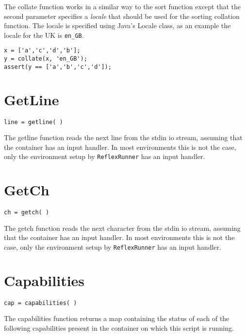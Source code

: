 The collate function works in a similar way to the sort function except that the second
parameter specifies a \emph{locale} that should be used for the sorting collation function.
The locale is specified using Java's Locale class, as an example the locale for the UK is
\Verb+en_GB+.

\begin{lstlisting}[caption={Collate example}]
x = ['a','c','d','b'];
y = collate(x, 'en_GB');
assert(y == ['a','b','c','d']);
\end{lstlisting}

\section{GetLine}
\begin{Verbatim}
line = getline( )
\end{Verbatim}

The getline function reads the next line from the stdin io stream, assuming that the \Reflex container
has an input handler. In most environments this is not the case, only the environment setup by \Verb+ReflexRunner+ has an
input handler.

\section{GetCh}
\begin{Verbatim}
ch = getch( )
\end{Verbatim}

The getch function reads the next character from the stdin io stream, assuming that the \Reflex container
has an input handler. In most environments this is not the case, only the environment setup by \Verb+ReflexRunner+ has an
input handler.

\section{Capabilities}
\begin{Verbatim}
cap = capabilities( )
\end{Verbatim}

The capabilities function returns a map containing the status of each of the following capabilities present in the \Reflex container
on which this script is running.


